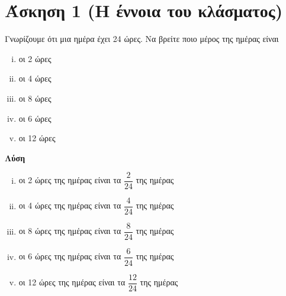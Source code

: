 \documentclass[a4paper,10pt]{report}
\begin{document}
\section*{Άσκηση 1  (Η έννοια του κλάσματος)\hfill \small{}}
Γνωρίζουμε ότι μια ημέρα έχει 24 ώρες. Να βρείτε ποιο μέρος της ημέρας είναι 
\begin{enumerate}[i)]
 \item οι 2 ώρες
 \item οι 4 ώρες
 \item οι 8 ώρες 
 \item οι 6 ώρες 
 \item οι 12 ώρες
\end{enumerate}
\textbf{Λύση}
\begin{enumerate}[i)]
 \item οι 2 ώρες της ημέρας είναι τα $\dfrac{2}{24}$ της ημέρας
 \item οι 4 ώρες της ημέρας είναι τα $\dfrac{4}{24}$ της ημέρας
 \item οι 8 ώρες της ημέρας είναι τα $\dfrac{8}{24}$ της ημέρας
 \item οι 6 ώρες της ημέρας είναι τα $\dfrac{6}{24}$ της ημέρας
 \item οι 12 ώρες της ημέρας είναι τα $\dfrac{12}{24}$ της ημέρας
\end{enumerate}
\end{document}
